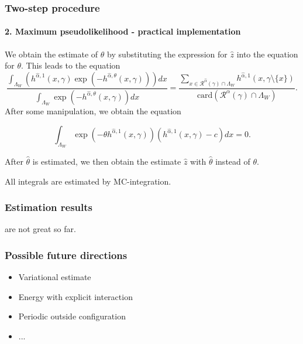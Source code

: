 \documentclass[c, 10pt]{beamer}
\begin{document}
\begin{frame}\frametitle{Two-step procedure}\framesubtitle{2. Maximum pseudolikelihood - practical implementation}
\begin{small}
We obtain the estimate of $\theta$ by substituting the expression for $\hat z$ into the equation for $\theta$. 
This leads to the equation
$$ 
\frac{\int_{\Lambda_W } (h^{\hat\alpha,1}(x,\gamma)\exp{\left(-h^{\hat\alpha,\theta}(x,\gamma)\right)}) dx} {  \int_{\Lambda_W } \exp{\left( -h^{\hat\alpha,\theta}(x,\gamma)\right)} dx} 
= \frac {\sum_{x \in \mathcal R^{\hat\alpha}(\gamma)\cap \Lambda_W } h^{\hat\alpha,1}(x,\gamma\setminus\{x\})} { \mbox{card}(\mathcal R^\alpha(\gamma)\cap \Lambda_W ) }. 
$$
After some manipulation, we obtain the equation

$$\int_{\Lambda_W} \exp{\left(-\theta h^{\hat\alpha, 1}(x,\gamma)\right)} (h^{\hat\alpha, 1}(x,\gamma) - c) dx = 0 .$$

After $\hat\theta$ is estimated, we then obtain the estimate $\hat z$ with $\hat\theta$ instead of $\theta$.

All integrals are estimated by MC-integration.
\end{small}
\end{frame}


\begin{frame}\frametitle{Estimation results}
are not great so far. 

\end{frame}





\begin{frame}\frametitle{Possible future directions}
\begin{itemize}
\item Variational estimate
\item Energy with explicit interaction
\item Periodic outside configuration
\item ...
\end{itemize}
\end{frame}



\end{document}
